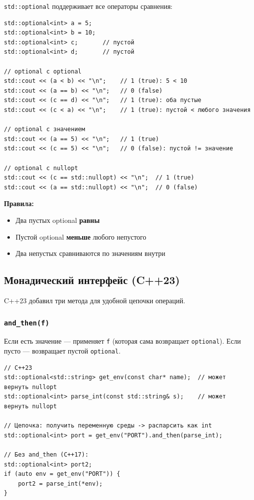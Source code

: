 \documentclass[a4paper,12pt]{article}
\begin{document}
\texttt{std::optional} поддерживает все операторы сравнения:

\begin{lstlisting}
std::optional<int> a = 5;
std::optional<int> b = 10;
std::optional<int> c;       // пустой
std::optional<int> d;       // пустой

// optional с optional
std::cout << (a < b) << "\n";    // 1 (true): 5 < 10
std::cout << (a == b) << "\n";   // 0 (false)
std::cout << (c == d) << "\n";   // 1 (true): оба пустые
std::cout << (c < a) << "\n";    // 1 (true): пустой < любого значения

// optional с значением
std::cout << (a == 5) << "\n";   // 1 (true)
std::cout << (c == 5) << "\n";   // 0 (false): пустой != значение

// optional с nullopt
std::cout << (c == std::nullopt) << "\n";  // 1 (true)
std::cout << (a == std::nullopt) << "\n";  // 0 (false)
\end{lstlisting}

\textbf{Правила:}
\begin{itemize}
    \item Два пустых optional \textbf{равны}
    \item Пустой optional \textbf{меньше} любого непустого
    \item Два непустых сравниваются по значениям внутри
\end{itemize}

\subsection{Монадический интерфейс (C++23)}

C++23 добавил три метода для удобной цепочки операций.

\subsubsection{\texttt{and\_then(f)}}

Если есть значение --- применяет \texttt{f} (которая сама возвращает \texttt{optional}).
Если пусто --- возвращает пустой \texttt{optional}.

\begin{lstlisting}
// C++23
std::optional<std::string> get_env(const char* name);  // может вернуть nullopt
std::optional<int> parse_int(const std::string& s);    // может вернуть nullopt

// Цепочка: получить переменную среды -> распарсить как int
std::optional<int> port = get_env("PORT").and_then(parse_int);

// Без and_then (C++17):
std::optional<int> port2;
if (auto env = get_env("PORT")) {
    port2 = parse_int(*env);
}
\end{lstlisting}
\end{document}

